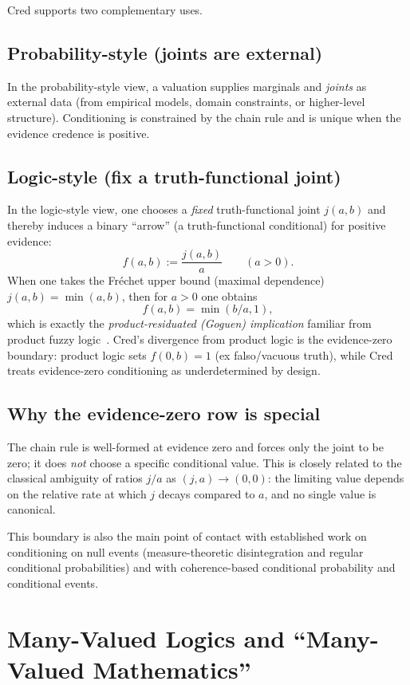 \documentclass[11pt,a4paper]{article}
\begin{document}
Cred supports two complementary uses.

\subsection{Probability-style (joints are external)}

In the probability-style view, a valuation supplies marginals and \emph{joints}
as external data (from empirical models, domain constraints, or higher-level
structure).  Conditioning is constrained by the chain rule and is unique when
the evidence credence is positive.

\subsection{Logic-style (fix a truth-functional joint)}

In the logic-style view, one chooses a \emph{fixed} truth-functional joint
$j(a,b)$ and thereby induces a binary ``arrow'' (a truth-functional conditional)
for positive evidence:
\[
f(a,b) := \frac{j(a,b)}{a}\qquad (a>0).
\]
When one takes the Fr\'echet upper bound (maximal dependence) $j(a,b)=\min(a,b)$,
then for $a>0$ one obtains
\[
f(a,b)=\min(b/a,1),
\]
which is exactly the \emph{product-residuated (Goguen) implication} familiar
from product fuzzy logic~\cite{hajek1998,goguen1969}.
Cred's divergence from product logic is the evidence-zero boundary: product
logic sets $f(0,b)=1$ (ex falso/vacuous truth), while Cred treats evidence-zero
conditioning as underdetermined by design.

\subsection{Why the evidence-zero row is special}

The chain rule is well-formed at evidence zero and forces only the joint
to be zero; it does \emph{not} choose a specific conditional value.  This is
closely related to the classical ambiguity of ratios $j/a$ as $(j,a)\to (0,0)$:
the limiting value depends on the relative rate at which $j$ decays compared to
$a$, and no single value is canonical.

This boundary is also the main point of contact with established work on
conditioning on null events (measure-theoretic disintegration and regular
conditional probabilities) and with coherence-based conditional probability and
conditional events.

\section{Many-Valued Logics and ``Many-Valued Mathematics''}
\end{document}

